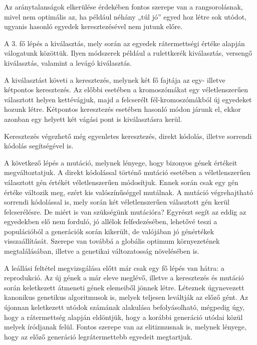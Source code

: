 \documentclass[12pt,a4paper,oneside]{report}
\begin{document}
Az aránytalanságok elkerülése érdekében fontos szerepe van a rangsorolásnak, mivel nem optimális az, ha például néhány „túl jó” egyed hoz létre sok utódot, ugyanis hasonló egyedek keresztezésével nem jutunk előre.

A 3. fő lépés a kiválasztás, mely során az egyedek rátermettségi értéke alapján válogatunk közöttük. Ilyen módszerek például a rulettkerék kiválasztás, versengő kiválasztás, valamint a levágó kiválasztás.

A kiválasztást követi a keresztezés, melynek két fő fajtája az egy- illetve kétpontos keresztezés. Az előbbi esetében a kromoszómákat egy véletlenszerűen választott helyen kettévágjuk, majd a felcserélt fél-kromoszómákból új egyedeket hozunk létre. Kétpontos keresztezés esetében hasonló módon járunk el, ekkor azonban egy helyett két vágási pont is kiválasztásra kerül.




Keresztezés végezhető még egyenletes keresztezés, direkt kódolás, illetve sorrendi kódolás segítségével is.

A következő lépés a mutáció, melynek lényege, hogy bizonyos gének értékeit megváltoztatjuk. A direkt kódolással történő mutáció esetében a véletlenszerűen választott gén értékét véletlenszerűen módosítjuk. Ennek során csak egy gén értéke változik meg, ezért kis valószínűséggel mutálnak. A mutáció végrehajtható sorrendi kódolással is, mely során két véletlenszerűen választott gén kerül felcserélésre. De miért is van szükségünk mutációra? Egyrészt segít az eddig az egyedekben elő nem forduló, jó allélok felfedezésében, lehetővé teszi a populációból a generációk során kikerült, de valójában jó génértékek visszaállítását. Szerepe van továbbá a globális optimum környezetének megtalálásában, illetve a genetikai változatosság növelésében is.

A leállási feltétel megvizsgálása előtt már csak egy fő lépés van hátra: a reprodukció. Az új gének a már eleve meglévő, illetve a keresztezés és mutáció során keletkezett átmeneti gének elemeiből jönnek létre. Léteznek úgynevezett kanonikus genetikus algoritmusok is, melyek teljesen leváltják az előző gént. Az újonnan keletkezett utódok számának alakulása befolyásolható, mégpedig úgy, hogy a rátermettség alapján eldöntjük, hogy a korábbi generáció utódai közül melyek íródjanak felül. Fontos szerepe van az elitizmusnak is, melynek lényege, hogy az előző generáció legrátermettebb egyedeit megtartjuk.
\end{document}
